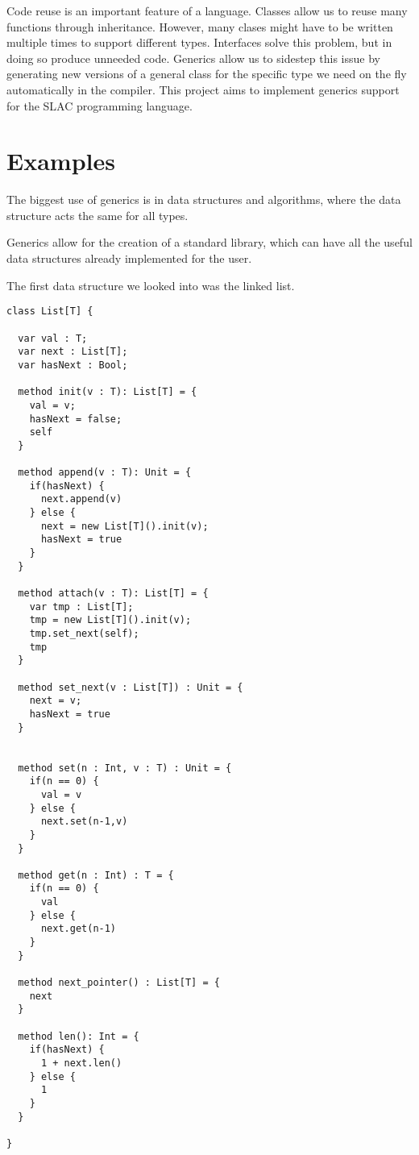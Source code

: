 \documentclass[nocopyrightspace,11pt,authoryear,preprint]{sigplanconf}
\begin{document}
Code reuse is an important feature of a language.  Classes allow us 
to reuse many functions through inheritance.  However, many clases 
might have to be written multiple times to support different types.
Interfaces solve this problem, but in doing so produce unneeded code.
Generics allow us to sidestep this issue by generating new versions of a general 
class for the specific type we need on the fly automatically in the compiler.
This project aims to implement generics support for the SLAC programming
language.

\section{Examples}

The biggest use of generics is in data structures and algorithms,
where the data structure acts the same for all types.

Generics allow for the creation of a standard library, which
can have all the useful data structures already implemented 
for the user.

The first data structure we looked into was the linked list.


\begin{lstlisting}
class List[T] {

  var val : T;
  var next : List[T];
  var hasNext : Bool;

  method init(v : T): List[T] = {
    val = v;
    hasNext = false;
    self 
  }

  method append(v : T): Unit = {
    if(hasNext) {
      next.append(v)
    } else {
      next = new List[T]().init(v);
      hasNext = true
    }
  }

  method attach(v : T): List[T] = {
    var tmp : List[T];
    tmp = new List[T]().init(v);
    tmp.set_next(self);
    tmp 
  }

  method set_next(v : List[T]) : Unit = {
    next = v;
    hasNext = true
  }


  method set(n : Int, v : T) : Unit = {
    if(n == 0) {
      val = v
    } else {
      next.set(n-1,v)
    }
  }

  method get(n : Int) : T = {
    if(n == 0) {
      val
    } else {
      next.get(n-1)
    }
  }
  
  method next_pointer() : List[T] = {
    next
  }

  method len(): Int = {
    if(hasNext) {
      1 + next.len()
    } else {
      1
    }
  }

}

\end{lstlisting}
\end{document}

